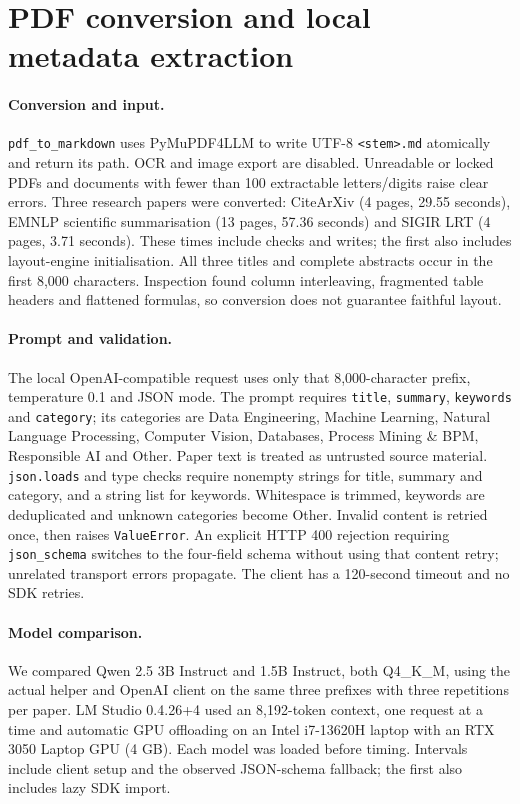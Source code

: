 \section{PDF conversion and local metadata extraction}
\label{sec:pdf-llm}

\paragraph{Conversion and input.}
\texttt{pdf\_to\_markdown} uses PyMuPDF4LLM to write UTF-8
\texttt{<stem>.md} atomically and return its path. OCR and image export
are disabled. Unreadable or locked PDFs and documents with fewer than
100 extractable letters/digits raise clear errors. Three research papers
were converted: CiteArXiv (4 pages, 29.55 seconds), EMNLP scientific
summarisation (13 pages, 57.36 seconds) and SIGIR LRT (4 pages,
3.71 seconds). These times include checks and writes; the first also
includes layout-engine initialisation. All three titles and complete
abstracts occur in the first 8,000 characters. Inspection found column
interleaving, fragmented table headers and flattened formulas, so
conversion does not guarantee faithful layout.

\paragraph{Prompt and validation.}
The local OpenAI-compatible request uses only that 8,000-character
prefix, temperature 0.1 and JSON mode. The prompt requires
\texttt{title}, \texttt{summary}, \texttt{keywords} and \texttt{category};
its categories are Data Engineering, Machine Learning, Natural Language
Processing, Computer Vision, Databases, Process Mining \& BPM,
Responsible AI and Other. Paper text is treated as untrusted source
material. \texttt{json.loads} and type checks require nonempty strings
for title, summary and category, and a string list for keywords.
Whitespace is trimmed, keywords are deduplicated and unknown categories
become Other. Invalid content is retried once, then raises
\texttt{ValueError}. An explicit HTTP 400 rejection requiring
\texttt{json\_schema} switches to the four-field schema without using
that content retry; unrelated transport errors propagate. The client
has a 120-second timeout and no SDK retries.

\paragraph{Model comparison.}
We compared Qwen 2.5 3B Instruct and 1.5B Instruct, both Q4\_K\_M, using
the actual helper and OpenAI client on the same three prefixes with
three repetitions per paper. LM Studio 0.4.26+4 used an 8,192-token
context, one request at a time and automatic GPU offloading on an
Intel i7-13620H laptop with an RTX 3050 Laptop GPU (4 GB). Each model
was loaded before timing. Intervals include client setup and the
observed JSON-schema fallback; the first also includes lazy SDK import.

